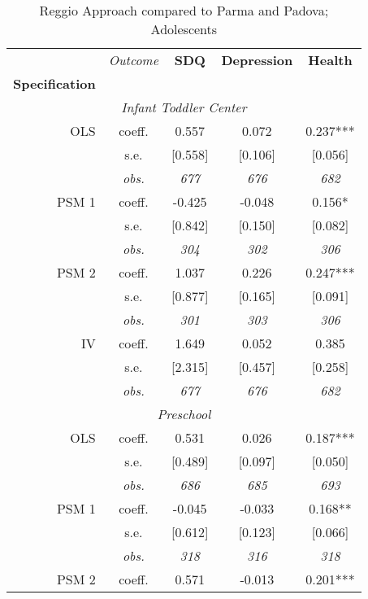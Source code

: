 \begin{table}[H]		
\caption{Reggio Approach compared to Parma and Padova; Adolescents}					
\label{tab:resultsAdo-parmapadova}					
 \begin{centering}		
\vspace{1ex}					
\begin{tabular}{ r c ccc}		
\hline \hline		
 & \textit{Outcome} & \textbf{SDQ}  & \textbf{Depression} & \textbf{Health}  \\		
\textbf{Specification}  &  &  &  &  \\		
\hline		
\multicolumn{5}{c}{\textit{Infant Toddler Center }} \\		
\hline		
					
OLS	 & coeff.	 & 0.557	 & 0.072	 & 0.237***	\\
	 & s.e.	 & [0.558]	 & [0.106]	 & [0.056]	\\
	 & \textit{obs.}	 & \textit{677}	 & \textit{676}	 & \textit{682}	\\
PSM 1	 & coeff.	 & -0.425	 & -0.048	 & 0.156*	\\
	 & s.e.	 & [0.842]	 & [0.150]	 & [0.082]	\\
	 & \textit{obs.}	 & \textit{304}	 & \textit{302}	 & \textit{306}	\\
PSM 2	 & coeff.	 & 1.037	 & 0.226	 & 0.247***	\\
	 & s.e.	 & [0.877]	 & [0.165]	 & [0.091]	\\
	 & \textit{obs.}	 & \textit{301}	 & \textit{303}	 & \textit{306}	\\
IV	 & coeff.	 & 1.649	 & 0.052	 & 0.385	\\
	 & s.e.	 & [2.315]	 & [0.457]	 & [0.258]	\\
	 & \textit{obs.}	 & \textit{677}	 & \textit{676}	 & \textit{682}	\\
\hline \multicolumn{5}{c}{\textit{Preschool }} \\ \hline					
OLS	 & coeff.	 & 0.531	 & 0.026	 & 0.187***	\\
	 & s.e.	 & [0.489]	 & [0.097]	 & [0.050]	\\
	 & \textit{obs.}	 & \textit{686}	 & \textit{685}	 & \textit{693}	\\
PSM 1	 & coeff.	 & -0.045	 & -0.033	 & 0.168**	\\
	 & s.e.	 & [0.612]	 & [0.123]	 & [0.066]	\\
	 & \textit{obs.}	 & \textit{318}	 & \textit{316}	 & \textit{318}	\\
PSM 2	 & coeff.	 & 0.571	 & -0.013	 & 0.201***	\\

\end{tabular}
\end{centering}
\end{table}
